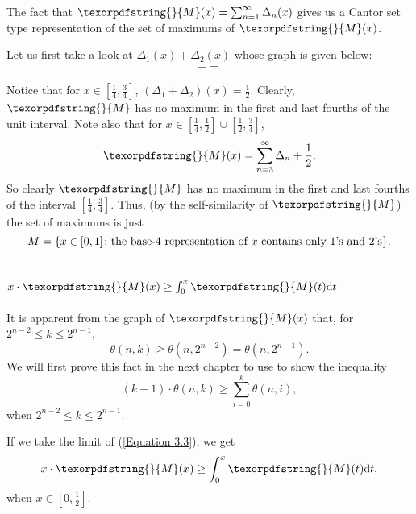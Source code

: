 \documentclass[12pt]{ucthesis}
\theoremstyle{plain}
\theoremstyle{definition}
\newcommand{\takagi}{
  \texorpdfstring{\protect}{M}
}
\begin{document}
The fact that $\takagi(x) = \sum_{n = 1}^\infty \Delta_n(x)$ gives us
a Cantor set type representation of the set of maximums of $\takagi(x)$.

Let us first take a look at $\Delta_1(x) + \Delta_2(x)$ whose graph is given below:
\begin{equation*}
 +
 =

\end{equation*}

Notice that for $x \in [\frac{1}{4}, \frac{3}{4}]$, $(\Delta_1 + \Delta_2)(x) = \frac{1}{2}$.
Clearly, $\takagi$ has no maximum in the first and last fourths of the unit interval.
Note also that for $x \in [\frac{1}{4}, \frac{1}{2}] \cup [\frac{1}{2}, \frac{3}{4}]$,
\begin{equation*}
\takagi(x) = \sum_{n = 3}^\infty \Delta_n + \frac{1}{2}.
\end{equation*}
So clearly $\takagi$ has no maximum in the first and last fourths of the interval
$[\frac{1}{4}, \frac{3}{4}]$.
Thus, (by the self-similarity of $\takagi$) the set of maximums is just
\begin{equation*}
M = \{x \in [0, 1] \colon \textnormal{the base-4 representation of } x \textnormal{ contains only 1's and 2's}\}.
\end{equation*}

\section{$x \cdot \takagi(x) \ge \int_0^x \takagi(t) \mathrm{d}t$}

It is apparent from the graph of $\takagi(x)$ that, for $2^{n - 2} \le k \le 2^{n - 1}$,
\begin{equation*}
\theta(n, k) \ge \theta(n, 2^{n - 2}) = \theta(n, 2^{n - 1}).
\end{equation*}
We will first prove this fact in the next chapter to use to show the inequality
\begin{equation}
\label{Equation 3.3}
(k + 1) \cdot \theta(n, k) \ge \sum_{i = 0}^k \theta(n, i),
\end{equation}
when $2^{n - 2} \le k \le 2^{n - 1}$.

If we take the limit of (\ref{Equation 3.3}), we get
\begin{equation*}
x \cdot \takagi(x) \ge \int_0^x \takagi(t) \mathrm{d}t,
\end{equation*}
when $x \in [0, \frac{1}{2}]$.
\end{document}
